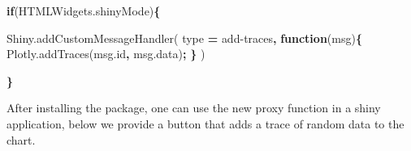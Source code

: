 \documentclass[
]{krantz}
\makeatletter
\newenvironment{Shaded}{\begin{snugshade}}{\end{snugshade}}
\newcommand{\AttributeTok}[1]{\textcolor[rgb]{0.61,0.61,0.61}{#1}}
\newcommand{\ControlFlowTok}[1]{\textcolor[rgb]{0.27,0.27,0.27}{\textbf{#1}}}
\newcommand{\KeywordTok}[1]{\textcolor[rgb]{0.27,0.27,0.27}{\textbf{#1}}}
\newcommand{\NormalTok}[1]{#1}
\newcommand{\OperatorTok}[1]{\textcolor[rgb]{0.43,0.43,0.43}{\textbf{#1}}}
\newcommand{\StringTok}[1]{\textcolor[rgb]{0.5,0.5,0.5}{#1}}
\newcommand{\VariableTok}[1]{\textcolor[rgb]{0,0,0}{#1}}
\newenvironment{kframe}{%
\medskip{}
\setlength{\fboxsep}{.8em}
 \def\at@end@of@kframe{}%
 \ifinner\ifhmode%
  \def\at@end@of@kframe{\end{minipage}}%
  \begin{minipage}{\columnwidth}%
 \fi\fi%
 \def\FrameCommand##1{\hskip\@totalleftmargin \hskip-\fboxsep
 \colorbox{shadecolor}{##1}\hskip-\fboxsep
     \hskip-\linewidth \hskip-\@totalleftmargin \hskip\columnwidth}%
 \MakeFramed {\advance\hsize-\width
   \@totalleftmargin\z@ \linewidth\hsize
   \@setminipage}}%
 {\par\unskip\endMakeFramed%
 \at@end@of@kframe}
\renewenvironment{Shaded}{\begin{kframe}}{\end{kframe}}
\makeatother
\begin{document}
\begin{Shaded}
\begin{Highlighting}[]
\ControlFlowTok{if}\NormalTok{(}\VariableTok{HTMLWidgets}\NormalTok{.}\AttributeTok{shinyMode}\NormalTok{)}\OperatorTok{\{}

  \VariableTok{Shiny}\NormalTok{.}\AttributeTok{addCustomMessageHandler}\NormalTok{(}
\NormalTok{    type }\OperatorTok{=} \StringTok{\textquotesingle{}add{-}traces\textquotesingle{}}\OperatorTok{,} \KeywordTok{function}\NormalTok{(msg)}\OperatorTok{\{}
      \VariableTok{Plotly}\NormalTok{.}\AttributeTok{addTraces}\NormalTok{(}\VariableTok{msg}\NormalTok{.}\AttributeTok{id}\OperatorTok{,} \VariableTok{msg}\NormalTok{.}\AttributeTok{data}\NormalTok{)}\OperatorTok{;}
    \OperatorTok{\}}
\NormalTok{  )}

\OperatorTok{\}}
\end{Highlighting}
\end{Shaded}

After installing the package, one can use the new proxy function in a shiny application, below we provide a button that adds a trace of random data to the chart.
\end{document}
